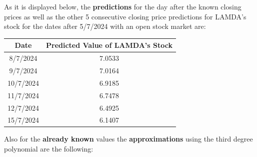 \documentclass{article}
\begin{document}
\begin{itemize}
    As it is displayed below, the \textbf{predictions} for the day after the known closing prices as well as the other 5 consecutive closing price predictions for LAMDA's stock for the dates after 5/7/2024 with an open stock market are:
    \begin{center}
    \begin{tabular}{|c|c|}
        \hline
        \textbf{Date} & \textbf{Predicted Value of LAMDA's Stock} \\
        \hline
        8/7/2024 & 7.0533 \\
        9/7/2024 & 7.0164 \\
        10/7/2024 & 6.9185 \\
        11/7/2024 & 6.7478 \\
        12/7/2024 & 6.4925 \\
        15/7/2024 & 6.1407 \\
        \hline
    \end{tabular}
\end{center}

Also for the \textbf{already known} values the \textbf{approximations} using the third degree polynomial are the following:
\begin{center}
    

\end{center}
\end{itemize}
\end{document}
